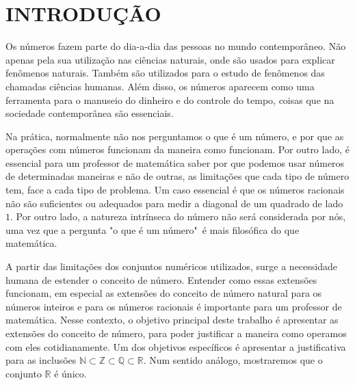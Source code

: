 \documentclass[../main.tex]{subfiles}
\begin{document}
\chapter{INTRODUÇÃO} %



    
    
    
    
    


Os números fazem parte do dia-a-dia das pessoas no mundo contemporâneo. Não apenas pela sua utilização nas ciências naturais, onde são usados para explicar fenômenos naturais. Também são utilizados para o estudo de fenômenos das chamadas ciências humanas. Além disso, os números aparecem como uma ferramenta para o manuseio do dinheiro e do controle do tempo, coisas que na sociedade contemporânea são essenciais.

Na prática, normalmente não nos perguntamos o que é um número, e por que as operações com números funcionam da maneira como funcionam. Por outro lado, é essencial para um professor de matemática saber por que podemos usar números de determinadas maneiras e não de outras, as limitações que cada tipo de número tem, face a cada tipo de problema. Um caso essencial é que os números racionais não são suficientes ou adequados para medir a diagonal de um quadrado de lado $1$. Por outro lado, a natureza intrínseca do número não será considerada por nós, uma vez que a pergunta "o que é um número"\ é mais  filosófica do que matemática.

A partir das limitações dos conjuntos numéricos utilizados, surge a necessidade humana de estender o conceito de número. Entender como essas extensões funcionam, em especial as extensões do conceito de número natural para os números inteiros e para os números racionais é importante para um professor de matemática. Nesse contexto, o objetivo principal deste trabalho é apresentar as extensões do conceito de número, para poder justificar a maneira como operamos com eles cotidianamente. Um dos objetivos específicos é apresentar a justificativa para as inclusões $\mathbb{N} \subset \mathbb{Z} \subset \mathbb{Q} \subset \mathbb{R}$. Num sentido análogo, mostraremos que o conjunto $\mathbb{R}$ é único. 
\end{document}
